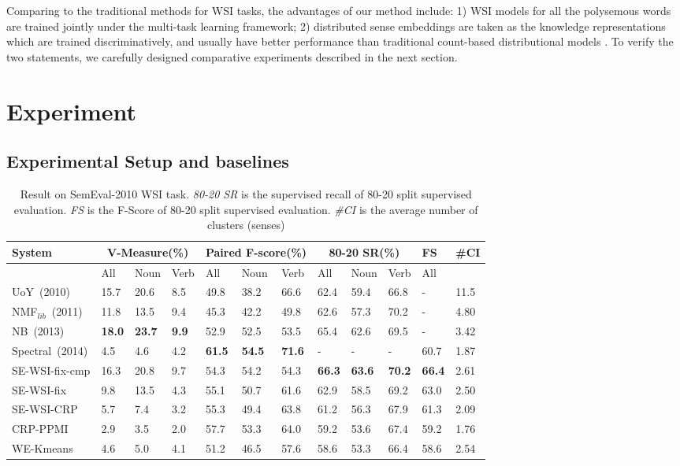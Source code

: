 \documentclass[11pt]{article}
\begin{document}
Comparing to the traditional methods for WSI tasks, the advantages of our method include: 
1) WSI models for all the polysemous words are trained jointly under the multi-task learning framework;
2) distributed sense embeddings are taken as the knowledge representations which are trained discriminatively, and usually have better performance than traditional count-based distributional models \cite{baroni-dinu-kruszewski:2014:P14-1}.
To verify the two statements, we carefully designed comparative experiments described in the next section.


\section{Experiment}

\subsection{Experimental Setup and baselines}

\begin{table*}
    \centering
    \begin{tabular}{|l|l|l|l|l|l|l|l|l|l|l|l|} 
       \hline
       System     & \multicolumn{3}{c|}{V-Measure(\%)} & \multicolumn{3}{c|}{Paired F-score(\%)} & \multicolumn{3}{c|}{80-20 SR(\%)} & FS &\#CI  \\
       \hline
                  & All  & Noun & Verb & All  & Noun & Verb & All  & Noun & Verb & All & \\
       \hline
        UoY~(2010) & 15.7 & 20.6 & 8.5  & 49.8 & 38.2 & 66.6 & 62.4 & 59.4 & 66.8 & -    & 11.5 \\
NMF$_{lib}$~(2011) & 11.8 & 13.5 & 9.4  & 45.3 & 42.2 & 49.8 & 62.6 & 57.3 & 70.2 & -    & 4.80  \\
         NB~(2013) & \textbf{18.0} & \textbf{23.7} & \textbf{9.9}  & 52.9 & 52.5 & 53.5 & 65.4 & 62.6 & 69.5 & -    & 3.42  \\
   Spectral~(2014) & 4.5  & 4.6  & 4.2  & \textbf{61.5} & \textbf{54.5} & \textbf{71.6} & -    & -    & -    & 60.7 & 1.87  \\
       \hline
   SE-WSI-fix-cmp  & 16.3  & 20.8 & 9.7  & 54.3 & 54.2 & 54.3 & \textbf{66.3} & \textbf{63.6} & \textbf{70.2}  & \textbf{66.4} & 2.61  \\
    SE-WSI-fix    & 9.8  & 13.5 & 4.3  & 55.1 & 50.7 & 61.6 & 62.9 & 58.5 & 69.2  & 63.0 & 2.50  \\
    SE-WSI-CRP    & 5.7  & 7.4  & 3.2  & 55.3 & 49.4 & 63.8 & 61.2 & 56.3 & 67.9  & 61.3 & 2.09  \\
       CRP-PPMI   & 2.9  & 3.5  & 2.0  & 57.7 & 53.3 & 64.0 & 59.2 & 53.6 & 67.4  & 59.2 & 1.76  \\
       WE-Kmeans  & 4.6  & 5.0  & 4.1  & 51.2 & 46.5 & 57.6 & 58.6 & 53.3 & 66.4  & 58.6 & 2.54  \\
       \hline
    \end{tabular}
    \caption{{Result on SemEval-2010 WSI task. \emph{80-20 SR} is the supervised recall of 80-20 split supervised evaluation. \emph{FS} is the F-Score of 80-20 split supervised evaluation. \emph{\#CI} is the average number of clusters (senses) }}
    \label{tab:semeval_2010}
\end{table*}
\end{document}
